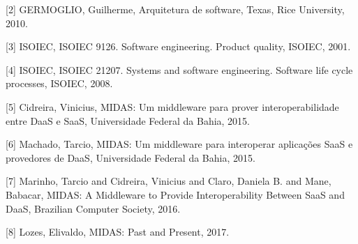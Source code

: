 \documentclass[11pt,a4paper]{article}
\begin{document}
[2] GERMOGLIO, Guilherme, Arquitetura de software, Texas, Rice University, 2010.

[3]  ISOIEC, ISOIEC 9126. Software engineering. Product quality, ISOIEC, 2001.

[4]  ISOIEC, ISOIEC 21207. Systems and software engineering. Software life cycle processes, ISOIEC, 2008.

[5]  Cidreira, Vinicius, MIDAS: Um middleware para prover interoperabilidade entre DaaS e SaaS, Universidade Federal da Bahia, 2015.

[6]  Machado, Tarcio, MIDAS: Um middleware para interoperar aplicações SaaS e provedores de DaaS, Universidade Federal da Bahia, 2015.

[7]  Marinho, Tarcio and Cidreira, Vinicius and Claro, Daniela B. and Mane, Babacar, MIDAS: A Middleware to Provide Interoperability Between SaaS and DaaS,
  Brazilian Computer Society, 2016.

[8]  Lozes, Elivaldo, MIDAS: Past and Present, 2017.
\end{document}
